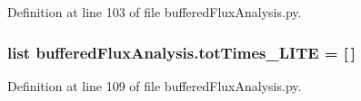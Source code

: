 Definition at line 103 of file buffered\-Flux\-Analysis.\-py.

\hypertarget{namespacebuffered_flux_analysis_afe01d8621771212d5e3d525f70d78090}{
\subsubsection[{tot\-Times\-\_\-\-L\-I\-T\-E}]{\setlength{\rightskip}{0pt plus 5cm}list buffered\-Flux\-Analysis.\-tot\-Times\-\_\-\-L\-I\-T\-E = \mbox{[}$\,$\mbox{]}}}\label{namespacebuffered_flux_analysis_afe01d8621771212d5e3d525f70d78090}


Definition at line 109 of file buffered\-Flux\-Analysis.\-py.

